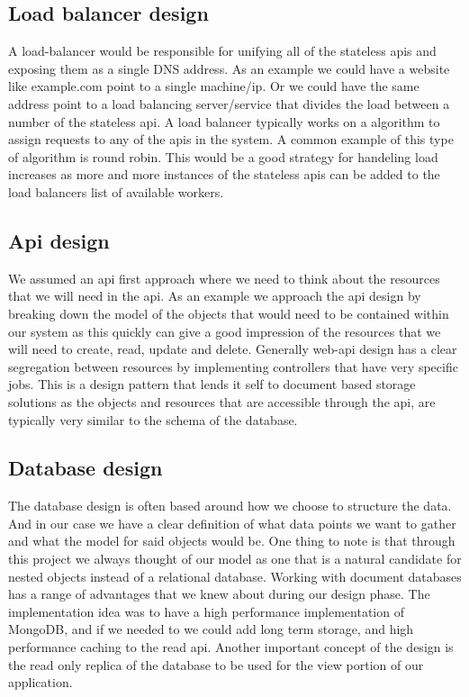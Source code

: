 \documentclass[]{uiophd}
\begin{document}
\subsection{Load balancer design}
A load-balancer would be responsible for unifying all of the stateless apis and exposing them as a single DNS address. As an example we could have a website like example.com point to a single machine/ip. Or we could have the same address point to a load balancing server/service that divides the load between a number of the stateless api. A load balancer typically works on a algorithm to assign requests to any of the apis in the system. A common example of this type of algorithm is round robin. This would be a good strategy for handeling load increases as more and more instances of the stateless apis can be added to the load balancers list of available workers.
\subsection{Api design}
We assumed an api first approach where we need to think about the resources that we will need in the api. As an example we approach the api design by breaking down the model of the objects that would need to be contained within our system as this quickly can give a good impression of the resources that we will need to create, read, update and delete. Generally web-api design has a clear segregation between resources by implementing controllers that have very specific jobs. This is a design pattern that lends it self to document based storage solutions as the objects and resources that are accessible through the api, are typically very similar to the schema of the database.
\subsection{Database design}
The database design is often based around how we choose to structure the data. And in our case we have a clear definition of what data points we want to gather and what the model for said objects would be. One thing to note is that through this project we always thought of our model as one that is a natural candidate for nested objects instead of a relational database. Working with document databases has a range of advantages that we knew about during our design phase. The implementation idea was to have a high performance implementation of MongoDB, and if we needed to we could add long term storage, and high performance caching to the read api. Another important concept of the design is the read only replica of the database to be used for the view portion of our application.
\end{document}
